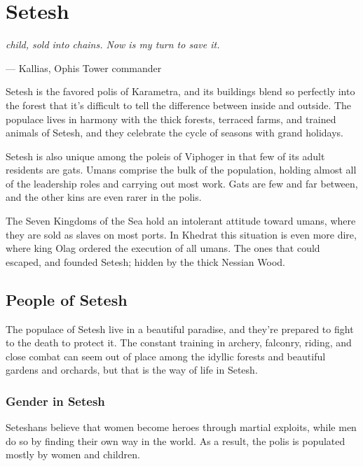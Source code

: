 \section{Setesh} \label{sec::setesh}
\textit{child, sold into chains.
Now is my turn to save it.}

\hspace*{\fill} --- Kallias, Ophis Tower commander

Setesh is the favored polis of Karametra, and its buildings blend so perfectly into the forest that it's difficult to tell the difference between inside and outside.
The populace lives in harmony with the thick forests, terraced farms, and trained animals of Setesh, and they celebrate the cycle of seasons with grand holidays.

Setesh is also unique among the poleis of Viphoger in that few of its adult residents are gats.
Umans comprise the bulk of the population, holding almost all of the leadership roles and carrying out most work.
Gats are few and far between, and the other kins are even rarer in the polis.

The Seven Kingdoms of the Sea hold an intolerant attitude toward umans, where they are sold as slaves on most ports.
In Khedrat this situation is even more dire, where king Olag ordered the execution of all umans.
The ones that could escaped, and founded Setesh; hidden by the thick Nessian Wood.


\subsection*{People of Setesh}
    The populace of Setesh live in a beautiful paradise, and they're prepared to fight to the death to protect it.
    The constant training in archery, falconry, riding, and close combat can seem out of place among the idyllic forests and beautiful gardens and orchards, but that is the way of life in Setesh.

    \subsubsection{Gender in Setesh}
        Seteshans believe that women become heroes through martial exploits, while men do so by finding their own way in the world.
        As a result, the polis is populated mostly by women and children.


